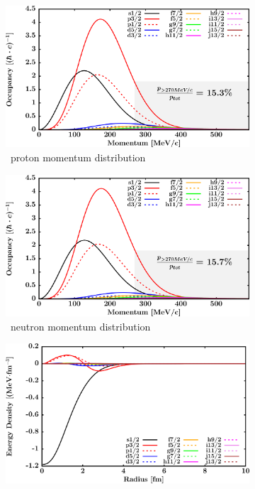 \begin{figure}[hbtp]
    \captionsetup[subfigure]{labelformat=empty}
    \centering
    \begin{subfigure}[b]{0.45\textwidth}
        \centering
        \includegraphics[width=\linewidth]{figures/o16_protonLJMomentumDistIntegral.png}
        \caption{\oSix\ proton momentum distribution}
        \label{DOMFitData_o16_proton_momentumDist}
    \end{subfigure}\hspace{6pt}
    \begin{subfigure}[b]{0.45\textwidth}
        \centering
        \includegraphics[width=\linewidth]{figures/o16_neutronLJMomentumDistIntegral.png}
        \caption{\oSix\ neutron momentum distribution}
        \label{DOMFitData_o16_neutron_momentumDist}
    \end{subfigure}\vspace{0.3in}
    \begin{subfigure}{0.45\textwidth}
        \centering
        \includegraphics[width=\linewidth]{figures/o16_EnergyDist.png}

\end{subfigure}
\end{figure}
